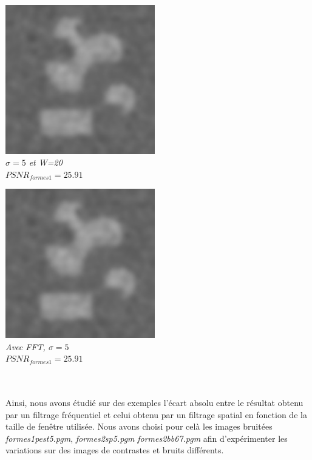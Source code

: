 \documentclass[a4,12pt]{article}
\begin{document}
\noindent
\begin{minipage}[c]{0.50\linewidth}
	\begin{center}
		\includegraphics[width = 65mm]{./img/2sp5-5-20.jpg}\\
		\textit{$\sigma=5$ et W=20}\\
		\textit{$PSNR_{formes1}=25.91$}
	\end{center}
\end{minipage}
\begin{minipage}[c]{0.50\linewidth}
	\begin{center}
		\includegraphics[width = 65mm]{./img/2sp5-5.jpg}\\
		\textit{Avec FFT, $\sigma=5$}\\
		\textit{$PSNR_{formes1}=25.91$}
	\end{center}
\end{minipage}\\
\\

Ainsi, nous avons étudié sur des exemples l'écart absolu entre le résultat obtenu par un filtrage fréquentiel et celui obtenu par un filtrage spatial en fonction de la taille de fenêtre utilisée. Nous avons choisi pour celà les images bruitées \textit{formes1pest5.pgm}, \textit{formes2sp5.pgm} \textit{formes2bb67.pgm} afin d'expérimenter les variations sur des images de contrastes et bruits différents.
\end{document}
